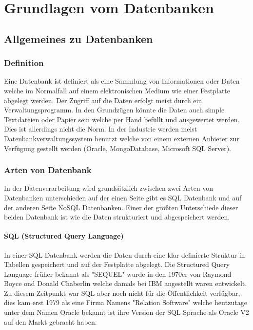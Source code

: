 \chapter{Grundlagen vom Datenbanken}
\bauer

	\section{Allgemeines zu Datenbanken}
	
	\subsection{Definition}
	Eine Datenbank ist definiert als eine Sammlung von Informationen oder Daten welche im Normalfall auf einem elektronischen Medium wie einer Festplatte abgelegt werden. Der Zugriff auf die Daten erfolgt meist durch ein Verwaltungsprogramm. In den Grundzügen könnte die Daten auch simple Textdateien oder Papier sein welche per Hand befüllt und ausgewertet werden. Dies ist allerdings nicht die Norm. In der Industrie werden meist Datenbankverwaltungssystem benutzt welche von einem externen Anbieter zur Verfügung gestellt werden (Oracle, MongoDatabase, Microsoft SQL Server).
	
	\subsection{Arten von Datenbank}
	In der Datenverarbeitung wird grundsätzlich zwischen zwei Arten von Datenbanken unterschieden auf der einen Seite gibt es SQL Datenbank und auf der anderen Seite NoSQL Datenbanken. Einer der größten Unterschiede dieser beiden Datenbank ist wie die Daten strukturiert und abgespeichert werden.
	
	\subsubsection{SQL (Structured Query Language)}
	In einer SQL Datenbank werden die Daten durch eine klar definierte Struktur in Tabellen gespeichert und auf der Festplatte abgelegt. Die Structured Query Language früher bekannt als "SEQUEL" wurde in den 1970er von Raymond Boyce ond Donald Chaberlin welche damals bei IBM angestellt waren entwickelt. Zu diesem Zeitpunkt war SQL aber noch nicht für die Öffentlichkeit verfügbar, dies kam erst 1979 als eine Firma Namens "Relation Software" welche heutzutage unter dem Namen Oracle bekannt ist ihre Version der SQL Sprache als Oracle V2 auf den Markt gebracht haben.
	
